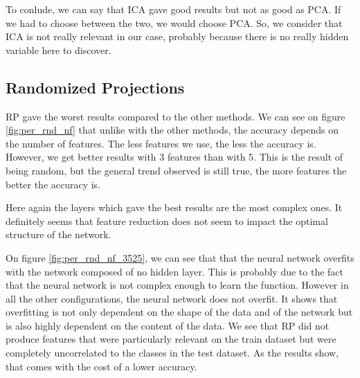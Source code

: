 \documentclass[twocolumn, 10pt]{article}
\begin{document}
			To conlude, we can say that ICA gave good results but not as good as PCA. If we had to choose between the two, we would choose PCA. So, we consider that ICA is not really relevant in our case, probably because there is no really hidden variable here to discover.
		\subsection{Randomized Projections}
			RP gave the worst results compared to the other methods. We can see on figure \ref{fig:per_rnd_nf} that unlike with the other methods, the accuracy depends on the number of features. The less features we use, the less the accuracy is. However, we get better results with 3 features than with 5. This is the result of being random, but the general
			trend observed is still true, the more features the better the accuracy is.

			Here again the layers which gave the best results are the most complex ones. It definitely seems that feature reduction does not seem to impact the optimal structure of the network.

			On figure \ref{fig:per_rnd_nf_3525}, we can see that that the neural network overfits with the network composed of no hidden layer. This is probably due to the fact that the neural network is not complex enough to learn the function. However in all the other configurations, the neural network does not overfit. It shows that overfitting is not only dependent on the shape of the data and of the network but is also highly dependent on the content of the data. We see that RP did not produce features that were particularly relevant on the train dataset but were completely uncorrelated to the classes in the test dataset. As the results show, that comes with the cost of a lower accuracy.
\end{document}
